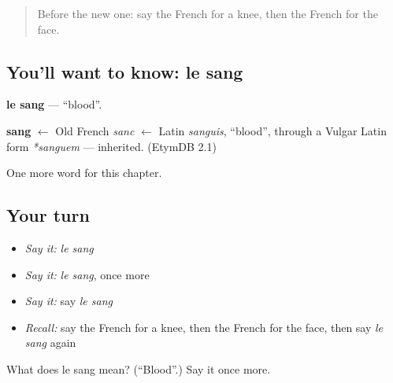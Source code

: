 \label{lesson:FR-C50-sang}



\begin{quote}
Before the new one: say the French for a knee, then the French for the face.
\end{quote}

\subsection*{You'll want to know: le sang}
\textbf{le sang} — \textquotedblleft{}blood\textquotedblright{}.

\begin{cousinweb}
\textbf{sang} $\leftarrow$ Old French \emph{sanc} $\leftarrow$ Latin \emph{sanguis}, \textquotedblleft{}blood\textquotedblright{}, through a Vulgar Latin form \emph{*sanguem} — inherited. (EtymDB 2.1)
\end{cousinweb}

\begin{grammarlens}[title={What you've built}]
One more word for this chapter.
\end{grammarlens}

\subsection*{Your turn}
\begin{itemize}
\raggedright
  \item \emph{Say it:} \emph{le sang}
  \item \emph{Say it:} \emph{le sang}, once more
  \item \emph{Say it:} say \emph{le sang}
  \item \emph{Recall:} say the French for a knee, then the French for the face, then say \emph{le sang} again
\end{itemize}

\begin{tcolorbox}[breakable,colback=teal!4,colframe=teal!35!black,title={Before you move on}]
What does le sang mean? (\textquotedblleft{}Blood\textquotedblright{}.) Say it once more.
\end{tcolorbox}
